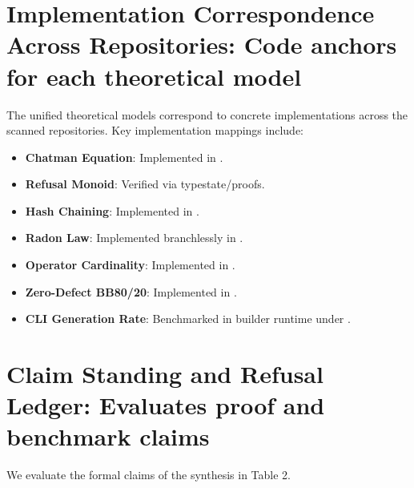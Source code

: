 \documentclass[11pt,a4paper]{article}
\begin{document}
\section{Implementation Correspondence Across Repositories: Code anchors for each theoretical model}
The unified theoretical models correspond to concrete implementations across the scanned repositories. Key implementation mappings include:
\begin{itemize}\raggedright
    \item \textbf{Chatman Equation}: Implemented in .
    \item \textbf{Refusal Monoid}: Verified via typestate/proofs.
    \item \textbf{Hash Chaining}: Implemented in .
    \item \textbf{Radon Law}: Implemented branchlessly in .
    \item \textbf{Operator Cardinality}: Implemented in .
    \item \textbf{Zero-Defect BB80/20}: Implemented in .
    \item \textbf{CLI Generation Rate}: Benchmarked in builder runtime under .
\end{itemize}

\section{Claim Standing and Refusal Ledger: Evaluates proof and benchmark claims}
We evaluate the formal claims of the synthesis in Table 2.
\end{document}
